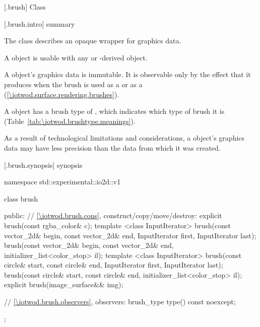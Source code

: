  [\iotwod.brush] {Class }

 [\iotwod.brush.intro] { summary}

\pnum
{}%
The class  describes an opaque wrapper for graphics data.

\pnum
A  object is usable with any  or -derived object.

\pnum
A  object's graphics data is immutable. It is observable only by the effect that it produces when the brush is used as a  or as a  (\ref{\iotwod.surface.rendering.brushes}).

\pnum
A  object has a brush type of , which indicates which type of brush it is (Table~\ref{tab:\iotwod.brushtype.meanings}).

\pnum
As a result of technological limitations and considerations, a  object's graphics data may have less precision than the data from which it was created.

%
 [\iotwod.brush.synopsis] { synopsis}

\begin{codeblock}
namespace std::experimental::io2d::v1 {
  class brush {
  public:
    // \ref{\iotwod.brush.cons}, construct/copy/move/destroy:
    explicit brush(const rgba_color& c);
    template <class InputIterator>
    brush(const vector_2d& begin, const vector_2d& end,
      InputIterator first, InputIterator last);
    brush(const vector_2d& begin, const vector_2d& end,
      initializer_list<color_stop> il);
    template <class InputIterator>
    brush(const circle& start, const circle& end,
      InputIterator first, InputIterator last);
    brush(const circle& start, const circle& end,
      initializer_list<color_stop> il);
    explicit brush(image_surface&& img);

    // \ref{\iotwod.brush.observers}, observers:
    brush_type type() const noexcept;
  };
}
\end{codeblock}

